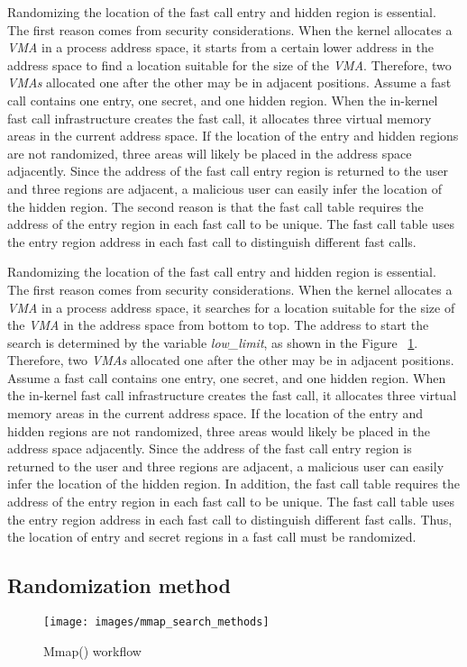 Randomizing the location of the fast call entry and hidden region is essential. 
The first reason comes from security considerations. 
When the kernel allocates a \emph{VMA} in a process address space, it starts from a 
certain lower address in the address space to find a location suitable for the 
size of the \emph{VMA}. Therefore, two \emph{VMAs}  allocated one after the other may be in adjacent 
positions. Assume a fast call contains one entry, one secret, and one hidden region. 
When the in-kernel fast call infrastructure creates the fast call, it allocates three 
virtual memory areas in the current address space. If the location of the entry and hidden 
regions are not randomized, three areas will likely be placed in the address space adjacently. 
Since the address of the fast call entry region is returned to the user and three regions are 
adjacent, a malicious user can easily infer the location of the hidden region. The second reason 
is that the fast call table requires the address of the entry region in each fast call to be unique. 
The fast call table uses the entry region address in each fast call to distinguish different fast calls.


Randomizing the location of the fast call entry and hidden region is essential. 
The first reason comes from security considerations. 
When the kernel allocates a \emph{VMA} in a process address space,  it searches 
for a location suitable for the size of the \emph{VMA} in the address space from 
bottom to top. The address to start the search is determined by the variable 
\emph{low\_limit}, as shown in the Figure ~\ref{fig:mmap_search_methods}. Therefore, two \emph{VMAs} 
allocated one after the 
other may be in adjacent positions. Assume a fast call contains one entry, one secret, 
and one hidden region. When the in-kernel fast call infrastructure creates the fast call, 
it allocates three virtual memory areas in the current address space. If the location of 
the entry and hidden regions are not randomized, three areas would likely be placed in the 
address space adjacently. Since the address of the fast call entry region is returned to the 
user and three regions are adjacent, a malicious user can easily infer the location of the 
hidden region. In addition, the fast call table requires the address of the entry region in 
each fast call to be unique. The fast call table uses the entry region address in each fast 
call to distinguish different fast calls. Thus, the location of entry and secret regions in a 
fast call must be randomized.
\subsection{Randomization method}
\begin{figure}[tbp]
  \centering
  \texttt{[image: images/mmap\_search\_methods]}
  \caption[Mmap() workflow]{Mmap() workflow}
  \label{fig:mmap_search_methods}
\end{figure}




